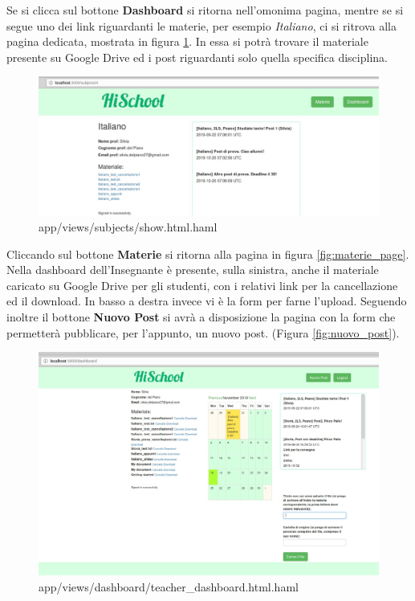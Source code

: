 \documentclass[Lau, binding=0.6cm, oneside]{sapthesis}
\begin{document}
Se si clicca sul bottone \textbf{Dashboard} si ritorna nell'omonima pagina, mentre se si segue uno dei link riguardanti le materie, per esempio \textit{Italiano}, ci si ritrova alla pagina dedicata, mostrata in figura \ref{fig:materia_page}. In essa si potrà trovare il materiale presente su Google Drive ed i post riguardanti solo quella specifica disciplina.

\begin{figure}[H]
	\centering
	\includegraphics[width=1\linewidth]{images/materia_page} 
	\caption{app/views/subjects/show.html.haml}
	\label{fig:materia_page}
\end{figure}

Cliccando sul bottone \textbf{Materie} si ritorna alla pagina in figura \ref{fig:materie_page}.\\

Nella dashboard dell'Insegnante è presente, sulla sinistra, anche il materiale caricato su Google Drive per gli studenti, con i relativi link per la cancellazione ed il download. In basso a destra invece vi è la form per farne l'upload. 
Seguendo inoltre il bottone \textbf{Nuovo Post} si avrà a disposizione la pagina con la form che permetterà pubblicare, per l'appunto, un nuovo post. (Figura \ref{fig:nuovo_post}).\\

\begin{figure}[H]
	\centering
	\includegraphics[width=1\linewidth]{images/t_dashboard} 
	\caption{app/views/dashboard/teacher\_dashboard.html.haml}
	\label{fig:t_dashboard}
\end{figure}
\end{document}
